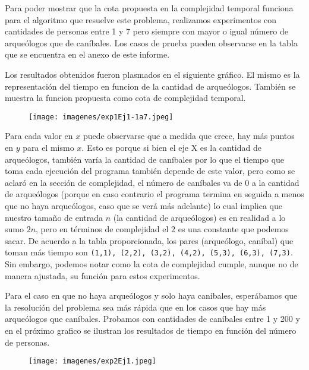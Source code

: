	Para poder mostrar que la cota propuesta en la complejidad temporal funciona para el algoritmo que resuelve este problema, realizamos experimentos con cantidades de personas entre 1 y 7 pero siempre con mayor o igual número de arqueólogos que de caníbales. Los casos de prueba pueden observarse en la tabla que se encuentra en el anexo de este informe.

  Los resultados obtenidos fueron plasmados en el siguiente gráfico. El mismo es la representación del tiempo en funcion de la cantidad de arqueólogos. También se muestra la funcion propuesta como cota de complejidad temporal.

  \begin{figure}[H]
      \begin{center}
        \texttt{[image: imagenes/exp1Ej1-1a7.jpeg]}
        \caption{}
      \end{center}
  \end{figure}

  Para cada valor en $x$ puede observarse que a medida que crece, hay más puntos en $y$ para el mismo $x$. Esto es porque si bien el eje X es la cantidad de arqueólogos, también varía la cantidad de caníbales por lo que el tiempo que toma cada ejecución del programa también depende de este valor, pero como se aclaró en la sección de complejidad, el número de caníbales va de 0 a la cantidad de arqueólogos (porque en caso contrario el programa termina en seguida a menos que no haya arqueólogos, caso que se verá más adelante) lo cual implica que nuestro tamaño de entrada $n$ (la cantidad de arqueólogos) es en realidad a lo sumo $2n$, pero en términos de complejidad el $2$ es una constante que podemos sacar.
  De acuerdo a la tabla proporcionada, los pares (arqueólogo, caníbal) que toman más tiempo son \texttt{(1,1), (2,2), (3,2), (4,2), (5,3), (6,3), (7,3)}. Sin embargo, podemos notar como la cota de complejidad cumple, aunque no de manera ajustada, su función para estos experimentos.


  Para el caso en que no haya arqueólogos y solo haya caníbales, esperábamos que la resolución del problema sea más rápida que en los casos que hay más arqueólogos que caníbales. Probamos con cantidades de caníbales entre 1 y 200 y en el próximo grafico se ilustran los resultados de tiempo en función del número de personas.

  \begin{figure}[H]
      \begin{center}
        \texttt{[image: imagenes/exp2Ej1.jpeg]}
        \caption{}
      \end{center}
  \end{figure}


